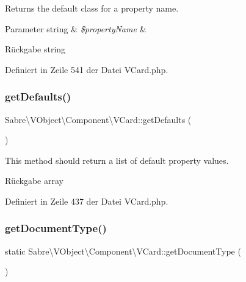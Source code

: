 Returns the default class for a property name.


\begin{DoxyParams}[1]{Parameter}
string & {\em \$property\+Name} & \\
\hline
\end{DoxyParams}
\begin{DoxyReturn}{Rückgabe}
string 
\end{DoxyReturn}


Definiert in Zeile 541 der Datei V\+Card.\+php.

\mbox{\label{class_sabre_1_1_v_object_1_1_component_1_1_v_card_a0f7b2fb1f4b5642260a2aeaace8f4694}} 
\subsubsection{\texorpdfstring{get\+Defaults()}{getDefaults()}}
{\footnotesize\ttfamily Sabre\textbackslash{}\+V\+Object\textbackslash{}\+Component\textbackslash{}\+V\+Card\+::get\+Defaults (\begin{DoxyParamCaption}{ }\end{DoxyParamCaption})\hspace{0.3cm}{\ttfamily [protected]}}

This method should return a list of default property values.

\begin{DoxyReturn}{Rückgabe}
array 
\end{DoxyReturn}


Definiert in Zeile 437 der Datei V\+Card.\+php.

\mbox{\label{class_sabre_1_1_v_object_1_1_component_1_1_v_card_aed97d4a640b93b28da36636fde9e646f}} 
\subsubsection{\texorpdfstring{get\+Document\+Type()}{getDocumentType()}}
{\footnotesize\ttfamily static Sabre\textbackslash{}\+V\+Object\textbackslash{}\+Component\textbackslash{}\+V\+Card\+::get\+Document\+Type (\begin{DoxyParamCaption}{ }\end{DoxyParamCaption})}

